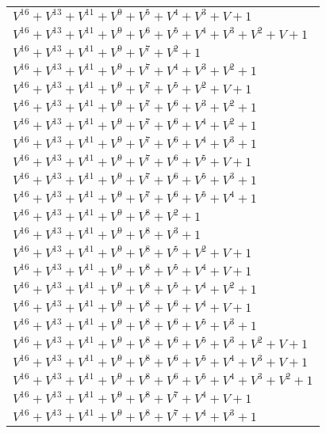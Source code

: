 \documentclass[12pt]{article}
\begin{document}
\begin{adjustwidth}{-4cm}{}
\begin{center}
\begin{longtable}{|l|}
$V^{16}  +V^{13}  +V^{11}  +V^{9}  +V^{5}  +V^{4}  +V^{3}  + V + 1$ \\
$V^{16}  +V^{13}  +V^{11}  +V^{9}  +V^{6}  +V^{5}  +V^{4}  +V^{3}  +V^{2}  + V + 1$ \\
$V^{16}  +V^{13}  +V^{11}  +V^{9}  +V^{7}  +V^{2}  + 1$ \\
$V^{16}  +V^{13}  +V^{11}  +V^{9}  +V^{7}  +V^{4}  +V^{3}  +V^{2}  + 1$ \\
$V^{16}  +V^{13}  +V^{11}  +V^{9}  +V^{7}  +V^{5}  +V^{2}  + V + 1$ \\
$V^{16}  +V^{13}  +V^{11}  +V^{9}  +V^{7}  +V^{6}  +V^{3}  +V^{2}  + 1$ \\
$V^{16}  +V^{13}  +V^{11}  +V^{9}  +V^{7}  +V^{6}  +V^{4}  +V^{2}  + 1$ \\
$V^{16}  +V^{13}  +V^{11}  +V^{9}  +V^{7}  +V^{6}  +V^{4}  +V^{3}  + 1$ \\
$V^{16}  +V^{13}  +V^{11}  +V^{9}  +V^{7}  +V^{6}  +V^{5}  + V + 1$ \\
$V^{16}  +V^{13}  +V^{11}  +V^{9}  +V^{7}  +V^{6}  +V^{5}  +V^{3}  + 1$ \\
$V^{16}  +V^{13}  +V^{11}  +V^{9}  +V^{7}  +V^{6}  +V^{5}  +V^{4}  + 1$ \\
$V^{16}  +V^{13}  +V^{11}  +V^{9}  +V^{8}  +V^{2}  + 1$ \\
$V^{16}  +V^{13}  +V^{11}  +V^{9}  +V^{8}  +V^{3}  + 1$ \\
$V^{16}  +V^{13}  +V^{11}  +V^{9}  +V^{8}  +V^{5}  +V^{2}  + V + 1$ \\
$V^{16}  +V^{13}  +V^{11}  +V^{9}  +V^{8}  +V^{5}  +V^{4}  + V + 1$ \\
$V^{16}  +V^{13}  +V^{11}  +V^{9}  +V^{8}  +V^{5}  +V^{4}  +V^{2}  + 1$ \\
$V^{16}  +V^{13}  +V^{11}  +V^{9}  +V^{8}  +V^{6}  +V^{4}  + V + 1$ \\
$V^{16}  +V^{13}  +V^{11}  +V^{9}  +V^{8}  +V^{6}  +V^{5}  +V^{3}  + 1$ \\
$V^{16}  +V^{13}  +V^{11}  +V^{9}  +V^{8}  +V^{6}  +V^{5}  +V^{3}  +V^{2}  + V + 1$ \\
$V^{16}  +V^{13}  +V^{11}  +V^{9}  +V^{8}  +V^{6}  +V^{5}  +V^{4}  +V^{3}  + V + 1$ \\
$V^{16}  +V^{13}  +V^{11}  +V^{9}  +V^{8}  +V^{6}  +V^{5}  +V^{4}  +V^{3}  +V^{2}  + 1$ \\
$V^{16}  +V^{13}  +V^{11}  +V^{9}  +V^{8}  +V^{7}  +V^{4}  + V + 1$ \\
$V^{16}  +V^{13}  +V^{11}  +V^{9}  +V^{8}  +V^{7}  +V^{4}  +V^{3}  + 1$ \\

\end{longtable}
\end{center}
\end{adjustwidth}
\end{document}
